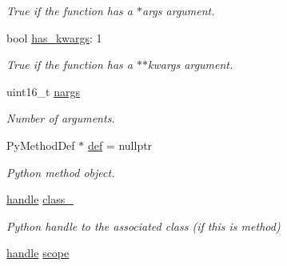 \begin{DoxyCompactItemize}
\begin{DoxyCompactList}\small\item\em True if the function has a \textquotesingle{}$\ast$args\textquotesingle{} argument. \end{DoxyCompactList}\item 
bool \hyperlink{structfunction__record_af72350bd8c047108e403ff873c0a1f7d}{has\+\_\+kwargs}\+: 1\hypertarget{structfunction__record_af72350bd8c047108e403ff873c0a1f7d}{}\label{structfunction__record_af72350bd8c047108e403ff873c0a1f7d}

\begin{DoxyCompactList}\small\item\em True if the function has a \textquotesingle{}$\ast$$\ast$kwargs\textquotesingle{} argument. \end{DoxyCompactList}\item 
uint16\+\_\+t \hyperlink{structfunction__record_a4a7ed8dc295f6f1351e59f10dee2b628}{nargs}\hypertarget{structfunction__record_a4a7ed8dc295f6f1351e59f10dee2b628}{}\label{structfunction__record_a4a7ed8dc295f6f1351e59f10dee2b628}

\begin{DoxyCompactList}\small\item\em Number of arguments. \end{DoxyCompactList}\item 
Py\+Method\+Def $\ast$ \hyperlink{structfunction__record_a3297bc630d16b17a5559025615390ffa}{def} = nullptr\hypertarget{structfunction__record_a3297bc630d16b17a5559025615390ffa}{}\label{structfunction__record_a3297bc630d16b17a5559025615390ffa}

\begin{DoxyCompactList}\small\item\em Python method object. \end{DoxyCompactList}\item 
\hyperlink{classhandle}{handle} \hyperlink{structfunction__record_a3b91117317742f0e53ff4e580aeae149}{class\+\_\+}\hypertarget{structfunction__record_a3b91117317742f0e53ff4e580aeae149}{}\label{structfunction__record_a3b91117317742f0e53ff4e580aeae149}

\begin{DoxyCompactList}\small\item\em Python handle to the associated class (if this is method) \end{DoxyCompactList}\item 
\hyperlink{classhandle}{handle} \hyperlink{structfunction__record_ad4112e6eb003c64f181968b2759a08af}{scope}\hypertarget{structfunction__record_ad4112e6eb003c64f181968b2759a08af}{}\label{structfunction__record_ad4112e6eb003c64f181968b2759a08af}


\end{DoxyCompactItemize}
